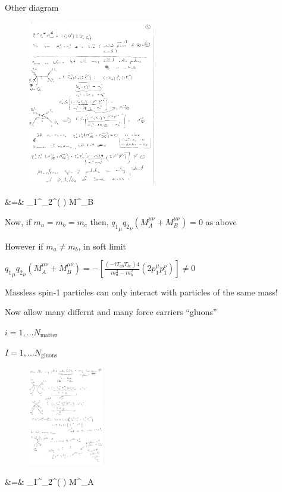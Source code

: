 {Other diagram
\begin{figure}[h]
\includegraphics[width=0.5\textwidth]{./comptonScattering4.pdf}
\end{figure}
\bea
&=&  \epsilon_1^\mu \epsilon_2^\nu \left(  \right) \equiv M^{\mu\nu}_B 
\eea

Now, if $m_a = m_b = m_c$ then, $ {q_1}_\mu {q_2}_\nu (M^{\mu\nu}_A + M^{\mu\nu}_B) = 0 $ as above 

However if $m_a \ne m_b$, in soft limit

$ {q_1}_\mu {q_2}_\nu (M^{\mu\nu}_A + M^{\mu\nu}_B) = -\left[ \frac{(-iT_{ab}T_{bc})4}{m_a^2 - m_b^2}  (2 p_1^\mu p_1^\nu) \right] \ne 0$

{\Large Massless spin-1 particles can only interact with particles of the same mass!}

\lineacross

\clearpage

Now allow many differnt  and many force carriers ``gluons'' 

$i = 1, ... N_{\textrm{matter}}$

$I = 1, ... N_{\textrm{gluons}}$

\begin{figure}[h]
\includegraphics[width=0.3\textwidth]{./comptonScattering5.pdf}
\end{figure}
\bea
&=&  \epsilon_1^\mu \epsilon_2^\nu \left(  \right) \equiv M^{\mu\nu}_A
\eea

}
